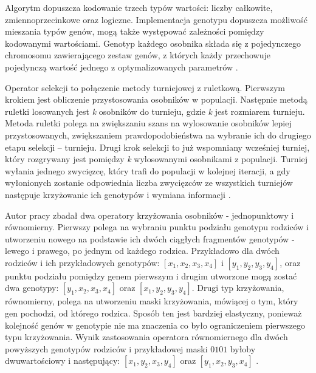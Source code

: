 \documentclass[11pt,a4paper]{llncs}
\begin{document}
Algorytm dopuszcza kodowanie trzech typów wartości: liczby całkowite, zmiennoprzecinkowe oraz logiczne.
Implementacja genotypu dopuszcza możliwość mieszania typów genów, mogą także występować zależności pomiędzy kodowanymi wartościami.
Genotyp każdego osobnika składa się z pojedynczego chromosomu zawierającego zestaw genów, z których każdy przechowuje pojedynczą wartość jednego z optymalizowanych parametrów \cite[str. 30]{klyk}.



Operator selekcji to połączenie metody turniejowej z ruletkową.
Pierwszym krokiem jest obliczenie przystosowania osobników w populacji.
Następnie metodą ruletki losowanych jest \emph{k} osobników do turnieju, gdzie \emph{k} jest rozmiarem turnieju.
Metoda ruletki polega na zwiększaniu szans na wylosowanie osobników lepiej przystosowanych, zwiększaniem prawdopodobieństwa na wybranie ich do drugiego etapu selekcji -- turnieju.
Drugi krok selekcji to już wspomniany wcześniej turniej, który rozgrywany jest pomiędzy \emph{k} wylosowanymi osobnikami z populacji.
Turniej wyłania jednego zwycięzcę, który trafi do populacji w kolejnej iteracji, a gdy wyłonionych zostanie odpowiednia liczba zwycięzców ze wszystkich turniejów następuje krzyżowanie ich genotypów i wymiana informacji \cite[str. 29]{klyk}.



Autor pracy \cite{klyk} zbadał dwa operatory krzyżowania osobników - jednopunktowy i równomierny.
Pierwszy polega na wybraniu punktu podziału genotypu rodziców i utworzeniu nowego na podstawie ich dwóch ciągłych fragmentów genotypów - lewego i prawego, po jednym od każdego rodzica.
Przykładowo dla dwóch rodziców i ich przykładowych genotypów: \( [x_{1}, x_{2}, x_{3}, x_{4}] \) i \( [y_{1}, y_{2}, y_{3}, y_{4}] \), oraz punktu podziału pomiędzy genem pierwszym i drugim utworzone mogą zostać dwa genotypy:  \( [y_{1}, x_{2}, x_{3}, x_{4}] \) oraz \( [x_{1}, y_{2}, y_{3}, y_{4}] \).
Drugi typ krzyżowania, równomierny, polega na utworzeniu maski krzyżowania, mówiącej o tym, który gen pochodzi, od którego rodzica.
Sposób ten jest bardziej elastyczny, ponieważ kolejność genów w genotypie nie ma znaczenia co było ograniczeniem pierwszego typu krzyżowania.
Wynik zastosowania operatora równomiernego dla dwóch powyższych genotypów rodziców i przykładowej maski \( 0101 \) byłoby dwuwartościowy i następujący: \( [x_{1}, y_{2}, x_{3}, y_{4}] \) oraz \( [y_{1}, x_{2}, y_{3}, x_{4}] \) \cite[str. 32]{klyk}.
\end{document}
